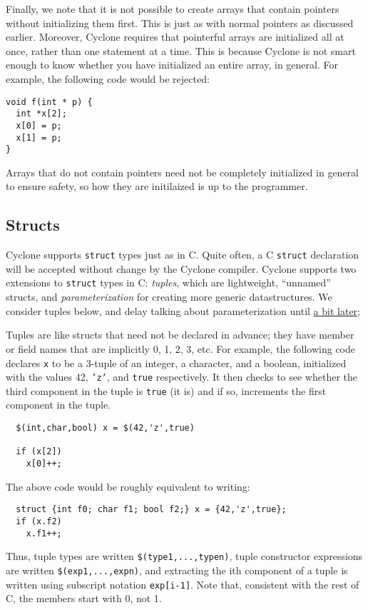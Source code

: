 Finally, we note that it is not possible to create arrays that contain
pointers without initializing them first.  This is just as with normal
pointers as discussed earlier.  Moreover, Cyclone requires that
pointerful arrays are initialized all at once, rather than one
statement at a time.  This is because Cyclone is not smart enough to
know whether you have initialized an entire array, in general.  For
example, the following code would be rejected:
\begin{verbatim}
void f(int * p) {
  int *x[2];
  x[0] = p;
  x[1] = p;
}
\end{verbatim}
Arrays that do not contain pointers need not be completely
initialized in general to ensure safety, so how they are initilaized
is up to the programmer.

\subsection{Structs}

Cyclone supports \texttt{struct} types just as in C.  Quite often, a C
\texttt{struct} declaration will be accepted without change by the
Cyclone compiler.  Cyclone supports two extensions to \texttt{struct}
types in C: \emph{tuples}, which are lightweight, ``unnamed'' structs,
and \emph{parameterization} for creating more generic datastructures.
We consider tuples below, and delay talking about parameterization
until \hyperref[{sec:polydat}]{a bit later}; 

Tuples are like structs that need not be declared in advance; they
have member or field names that are implicitly 0, 1, 2, 3, etc.  For
example, the following code declares \texttt{x} to be a 3-tuple of an
integer, a character, and a boolean, initialized with the values 42,
\texttt{'z'}, and \texttt{true} respectively.  It then checks to see
whether the third component in the tuple is \texttt{true} (it is) and
if so, increments the first component in the tuple.
\begin{verbatim}
  $(int,char,bool) x = $(42,'z',true)

  if (x[2])
    x[0]++;
\end{verbatim}

The above code would be roughly equivalent to writing:
\begin{verbatim}
  struct {int f0; char f1; bool f2;} x = {42,'z',true};
  if (x.f2)
    x.f1++;
\end{verbatim}

Thus, tuple types are written \texttt{\$(type1,...,typen)}, tuple
constructor expressions are written \texttt{\$(exp1,...,expn)}, and
extracting the ith component of a tuple is written using subscript
notation \texttt{exp[i-1]}.  Note that, consistent with the rest of C,
the members start with 0, not 1.


